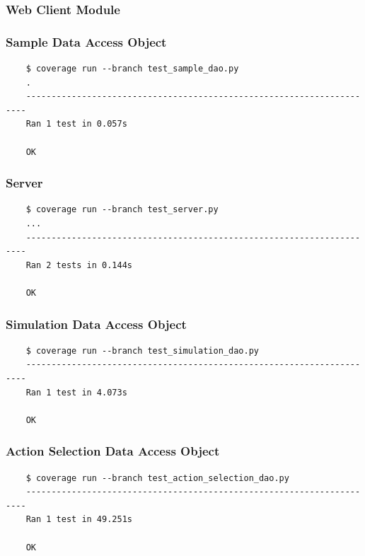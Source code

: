 \documentclass[a4paper,11pt]{article}
\begin{document}
\subsubsection{Web Client Module}
\subsubsection*{{\hspace{6mm}}Sample Data Access Object}
\begin{verbatim}
    $ coverage run --branch test_sample_dao.py 
    .
    ----------------------------------------------------------------------
    Ran 1 test in 0.057s

    OK
\end{verbatim}

\subsubsection*{{\hspace{6mm}}Server}
\begin{verbatim}
    $ coverage run --branch test_server.py
    ...
    ----------------------------------------------------------------------
    Ran 2 tests in 0.144s

    OK
\end{verbatim}

\subsubsection*{{\hspace{6mm}}Simulation Data Access Object}
\begin{verbatim}
    $ coverage run --branch test_simulation_dao.py
    ----------------------------------------------------------------------
    Ran 1 test in 4.073s

    OK
\end{verbatim}

\subsubsection*{{\hspace{6mm}}Action Selection Data Access Object}
\begin{verbatim}
    $ coverage run --branch test_action_selection_dao.py
    ----------------------------------------------------------------------
    Ran 1 test in 49.251s

    OK
\end{verbatim} 
    
\end{document}
